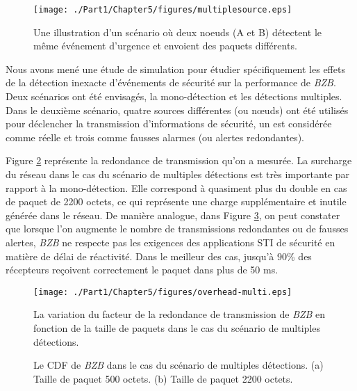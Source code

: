 \begin{figure}[!h]
\centering
\texttt{[image: ./Part1/Chapter5/figures/multiplesource.eps]}
\caption{Une illustration d'un scénario où deux noeuds (A et B) détectent le même événement d'urgence et envoient des paquets différents.}
\label{scen-multi}
\end{figure}

Nous avons mené une étude de simulation pour étudier spécifiquement les effets de la détection inexacte d'événements de sécurité sur la performance de \textit{BZB}. Deux scénarios ont été envisagés, la mono-détection et les détections multiples. Dans le deuxième scénario, quatre sources différentes (ou nœuds) ont été utilisés pour déclencher la transmission d'informations de sécurité, un est considérée comme réelle et trois comme fausses alarmes (ou alertes redondantes).

Figure \ref{overhead-multi} représente la redondance de transmission qu'on a mesurée. La surcharge du réseau dans le cas du scénario de multiples détections est très importante par rapport à la mono-détection. Elle correspond à quasiment plus du double en cas de paquet de 2200 octets, ce qui représente une charge supplémentaire et inutile générée dans le réseau.
De manière analogue, dans Figure \ref{cdf-multi}, on peut constater que lorsque l'on augmente le nombre de transmissions redondantes ou de fausses alertes, \textit{BZB} ne respecte pas les exigences des applications STI de sécurité en matière de délai de réactivité. Dans le meilleur des cas, jusqu'à 90\% des récepteurs re\c{c}oivent correctement le paquet dans plus de 50 ms.

\begin{figure}[!h]
\centering
\texttt{[image: ./Part1/Chapter5/figures/overhead-multi.eps]}
\caption{La variation du facteur de la redondance de transmission de \textit{BZB} en fonction de la taille de paquets dans le cas du scénario de multiples détections.}
\label{overhead-multi}
\end{figure}

\begin{figure}[!h]
\centering
{}
\caption{Le CDF de \textit{BZB} dans le cas du scénario de multiples détections. (a) Taille de paquet 500 octets. (b) Taille de paquet 2200 octets.}
\label{cdf-multi}
\end{figure}

